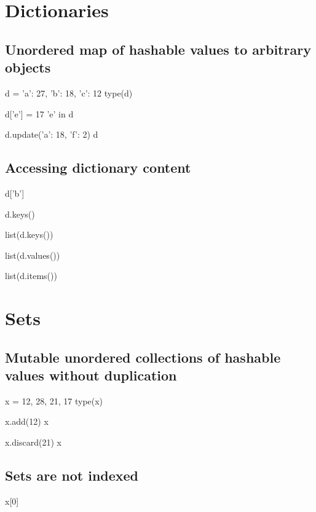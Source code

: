 \documentclass[aspectratio=1610,slidestop]{beamer}
\begin{document}
\section{Dictionaries}
\subsection{Unordered map of hashable values to arbitrary objects}
\begin{pframe}
\begin{pyconsole}
d = {'a': 27, 'b': 18, 'c': 12}
type(d)

d['e'] = 17
'e' in d

d.update({'a': 18, 'f': 2})
d
\end{pyconsole}
\end{pframe}


\subsection{Accessing dictionary content}
\begin{pframe}
\begin{pyconsole}
d['b']

d.keys()

list(d.keys())

list(d.values())

list(d.items())
\end{pyconsole}
\end{pframe}


\section{Sets}

\subsection{Mutable unordered collections of hashable values without duplication}
\begin{pframe}
\begin{pyconsole}
x = {12, 28, 21, 17}
type(x)

x.add(12)
x

x.discard(21)
x
\end{pyconsole}
\end{pframe}

\subsection{Sets are not indexed}
\begin{pframe}
\begin{pyconsole}
x[0]
\end{pyconsole}
\end{pframe}
\end{document}
